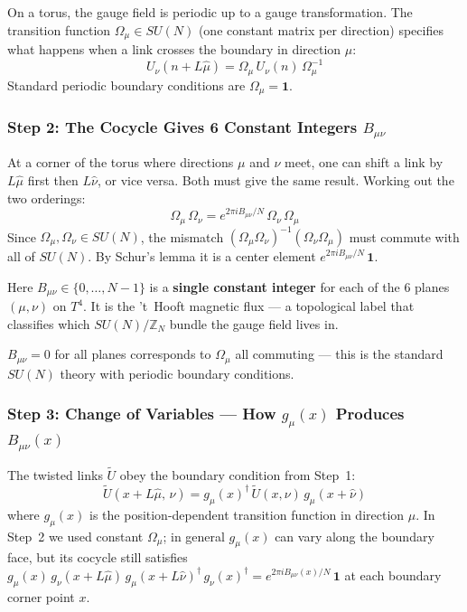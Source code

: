 \documentclass[12pt,a4paper]{article}
\begin{document}
On a torus, the gauge field is periodic up to a gauge transformation.
The transition function $\Omega_\mu \in SU(N)$ (one constant matrix per direction)
specifies what happens when a link crosses the boundary in direction $\mu$:
\begin{equation}
  U_\nu(n + L\hat\mu) = \Omega_\mu\,U_\nu(n)\,\Omega_\mu^{-1}
\end{equation}
Standard periodic boundary conditions are $\Omega_\mu = \mathbf{1}$.

\subsubsection*{Step 2: The Cocycle Gives 6 Constant Integers $B_{\mu\nu}$}

At a corner of the torus where directions $\mu$ and $\nu$ meet,
one can shift a link by $L\hat\mu$ first then $L\hat\nu$, or vice versa.
Both must give the same result. Working out the two orderings:
\begin{equation}
  \Omega_\mu\,\Omega_\nu = e^{2\pi i B_{\mu\nu}/N}\,\Omega_\nu\,\Omega_\mu
\end{equation}
Since $\Omega_\mu,\Omega_\nu \in SU(N)$, the mismatch
$(\Omega_\mu\Omega_\nu)^{-1}(\Omega_\nu\Omega_\mu)$
must commute with all of $SU(N)$.
By Schur's lemma it is a center element $e^{2\pi i B_{\mu\nu}/N}\,\mathbf{1}$.

Here $B_{\mu\nu} \in \{0,\ldots,N{-}1\}$ is a \textbf{single constant integer}
for each of the 6 planes $(\mu,\nu)$ on $T^4$.
It is the 't~Hooft magnetic flux --- a topological label that classifies
which $SU(N)/\mathbb{Z}_N$ bundle the gauge field lives in.

$B_{\mu\nu} = 0$ for all planes corresponds to $\Omega_\mu$ all commuting ---
this is the standard $SU(N)$ theory with periodic boundary conditions.

\subsubsection*{Step 3: Change of Variables --- How $g_\mu(x)$ Produces $B_{\mu\nu}(x)$}

The twisted links $\tilde U$ obey the boundary condition from Step~1:
\begin{equation}
  \tilde U(x + L\hat\mu,\,\nu) = g_\mu(x)^\dagger\,\tilde U(x,\nu)\,g_\mu(x+\hat\nu)
\end{equation}
where $g_\mu(x)$ is the position-dependent transition function in direction $\mu$.
In Step~2 we used constant $\Omega_\mu$; in general $g_\mu(x)$ can vary along the boundary face,
but its cocycle still satisfies
$g_\mu(x)\,g_\nu(x{+}L\hat\mu)\,g_\mu(x{+}L\hat\nu)^\dagger\,g_\nu(x)^\dagger
= e^{2\pi iB_{\mu\nu}(x)/N}\,\mathbf{1}$
at each boundary corner point $x$.
\end{document}
